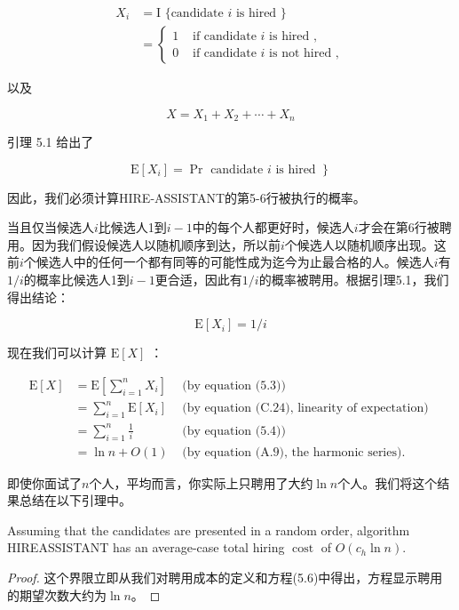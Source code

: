 \documentclass[lang=cn,newtx,10pt,scheme=chinese]{elegantbook}
\begin{document}
$$
\begin{aligned}
X_i & =\mathrm{I} \text { \{candidate } i \text { is hired }\} \\
& = \begin{cases}1 & \text { if candidate } i \text { is hired }, \\
0 & \text { if candidate } i \text { is not hired },\end{cases}
\end{aligned}
$$

以及

$$
X=X_1+X_2+\cdots+X_n
$$

引理 5.1 给出了

$$
\left.\mathrm{E}\left[X_i\right]=\operatorname{Pr} \text { candidate } i \text { is hired }\right\}
$$

因此，我们必须计算HIRE-ASSISTANT的第5-6行被执行的概率。

当且仅当候选人$i$比候选人1到$i-1$中的每个人都更好时，候选人$i$才会在第6行被聘用。因为我们假设候选人以随机顺序到达，所以前$i$个候选人以随机顺序出现。这前$i$个候选人中的任何一个都有同等的可能性成为迄今为止最合格的人。候选人$i$有$1/i$的概率比候选人1到$i-1$更合适，因此有$1/i$的概率被聘用。根据引理5.1，我们得出结论：

$$
\mathrm{E}\left[X_i\right]=1 / i
$$

现在我们可以计算 $\mathrm{E}[X]$ ：

$$
\begin{array}{rlr}
\mathrm{E}[X] & =\mathrm{E}\left[\sum_{i=1}^n X_i\right] & \text { (by equation (5.3)) } \\
& =\sum_{i=1}^n \mathrm{E}\left[X_i\right] & \text { (by equation (C.24), linearity of expectation) } \\
& =\sum_{i=1}^n \frac{1}{i} & \text { (by equation (5.4)) } \\
& =\ln n+O(1) & \text { (by equation (A.9), the harmonic series). }
\end{array}
$$

即使你面试了$n$个人，平均而言，你实际上只聘用了大约$\ln n$个人。我们将这个结果总结在以下引理中。

\begin{lemma}{}{}
Assuming that the candidates are presented in a random order, algorithm HIREASSISTANT has an average-case total hiring $\operatorname{cost}$ of $O\left(c_h \ln n\right)$.
\end{lemma}

\begin{proof}
这个界限立即从我们对聘用成本的定义和方程(5.6)中得出，方程显示聘用的期望次数大约为$\ln n$。
\end{proof}
\end{document}
